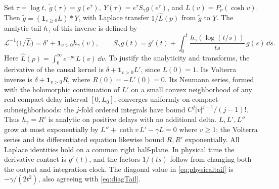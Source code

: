 Set \(\tau=\log t,\ \widetilde g(\tau)=g(e^\tau),\ Y(\tau)=e^\tau S_\gamma g(e^\tau)\), and \(L(v)=P_\nu(\cosh v)\). Then \(\widetilde g=({\boldsymbol1}_{v\ge0}L)*Y\), with Laplace transfer \(1/\widehat L(p)\) from \(\widetilde g\) to \(Y\).
The analytic tail \(h_\gamma\) of this inverse is defined by
\begin{equation}
 \mathcal L^{-1}\bigl(1/\widehat L\bigr)
       =\delta'+{\boldsymbol1}_{v>0}h_\gamma(v),\qquad
 S_\gamma g(t)=g'(t)+\int_0^t\frac{h_\gamma(\log(t/s))}{ts}\,g(s)\,\dd s .
 \label{eq:physicaltail}
\end{equation}
Here \(\widehat L(p)=\int_0^\infty e^{-pv}L(v)\,\dd v\). To justify the analyticity and transforms, the derivative of the causal kernel is \(\delta+{\boldsymbol1}_{v>0}L'\), since \(L(0)=1\). Its Volterra inverse is \(\delta+{\boldsymbol1}_{v>0}R\), where \(R(0)=-L'(0)=0\). Its Neumann series, formed with the holomorphic continuation of \(L'\) on a small convex neighborhood of any real compact delay interval \([0,L_0]\), converges uniformly on compact subneighborhoods: the \(j\)-fold ordered integrals have bound \(C^j |v|^{j-1}/(j-1)!\). Thus \(h_\gamma=R'\) is analytic on positive delays with no additional delta. \(L,L',L''\) grow at most exponentially by \(L''+\coth v\,L'-\gamma L=0\) where \(v\ge1\); the Volterra series and its differentiated equation likewise bound \(R,R'\) exponentially. All Laplace identities hold on a common right half-plane. In physical time the derivative contact is \(g'(t)\), and the factors \(1/(ts)\) follow from changing both the output and integration clock. The diagonal value in \eqref{eq:physicaltail} is \(-\gamma/(2t^2)\), also agreeing with \eqref{eq:diagTail}.

